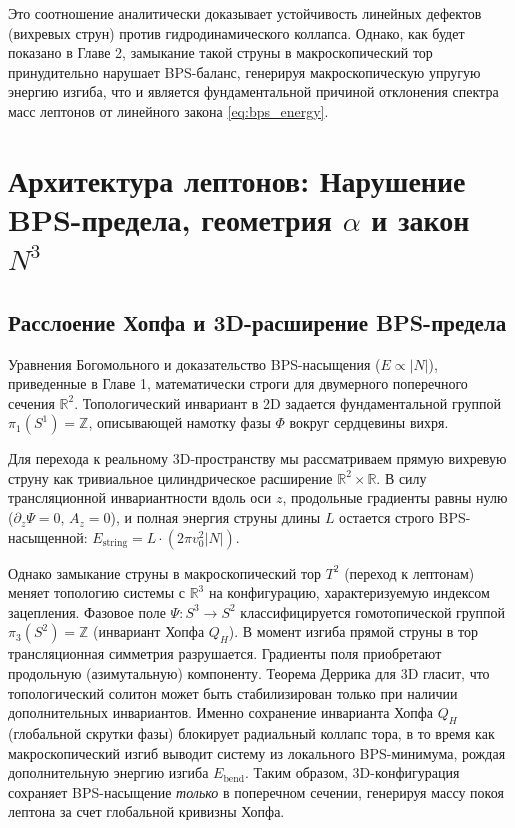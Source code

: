 \documentclass[11pt,a4paper]{article}
\begin{document}
Это соотношение аналитически доказывает устойчивость линейных дефектов (вихревых струн) против гидродинамического коллапса. Однако, как будет показано в Главе 2, замыкание такой струны в макроскопический тор принудительно нарушает BPS-баланс, генерируя макроскопическую упругую энергию изгиба, что и является фундаментальной причиной отклонения спектра масс лептонов от линейного закона \eqref{eq:bps_energy}.
	
\section{Архитектура лептонов: Нарушение BPS-предела, геометрия $\alpha$ и закон $N^3$}
	
\subsection{Расслоение Хопфа и 3D-расширение BPS-предела}
Уравнения Богомольного и доказательство BPS-насыщения ($E \propto |N|$), приведенные в Главе 1, математически строги для двумерного поперечного сечения $\mathbb{R}^2$. Топологический инвариант в 2D задается фундаментальной группой $\pi_1(S^1) = \mathbb{Z}$, описывающей намотку фазы $\Phi$ вокруг сердцевины вихря. 

Для перехода к реальному 3D-пространству мы рассматриваем прямую вихревую струну как тривиальное цилиндрическое расширение $\mathbb{R}^2 \times \mathbb{R}$. В силу трансляционной инвариантности вдоль оси $z$, продольные градиенты равны нулю ($\partial_z \Psi = 0$, $A_z = 0$), и полная энергия струны длины $L$ остается строго BPS-насыщенной: $E_{\text{string}} = L \cdot (2\pi v_0^2 |N|)$. 

Однако замыкание струны в макроскопический тор $T^2$ (переход к лептонам) меняет топологию системы с $\mathbb{R}^3$ на конфигурацию, характеризуемую индексом зацепления. Фазовое поле $\Psi: S^3 \to S^2$ классифицируется гомотопической группой $\pi_3(S^2) = \mathbb{Z}$ (инвариант Хопфа $Q_H$).
В момент изгиба прямой струны в тор трансляционная симметрия разрушается. Градиенты поля приобретают продольную (азимутальную) компоненту. Теорема Деррика для 3D гласит, что топологический солитон может быть стабилизирован только при наличии дополнительных инвариантов. Именно сохранение инварианта Хопфа $Q_H$ (глобальной скрутки фазы) блокирует радиальный коллапс тора, в то время как макроскопический изгиб выводит систему из локального BPS-минимума, рождая дополнительную энергию изгиба $E_{\text{bend}}$. Таким образом, 3D-конфигурация сохраняет BPS-насыщение \textit{только} в поперечном сечении, генерируя массу покоя лептона за счет глобальной кривизны Хопфа.
\end{document}
